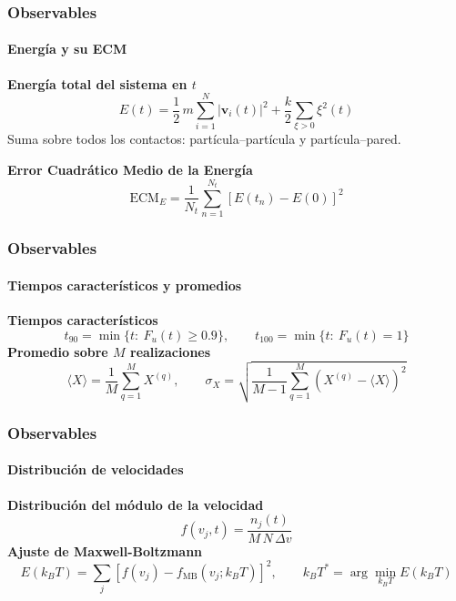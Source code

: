 \documentclass[11pt,aspectratio=169]{beamer}
\newcommand{\vect}[1]{\mathbf{#1}}          %
\newcommand{\kT}{k_BT}
\newcommand{\ecmE}{\mathrm{ECM}_E}           %
\begin{document}
\begin{frame}
  \frametitle{Observables}
  \framesubtitle{Energía y su ECM}

  \vfill
  \begin{center}
    \textbf{Energía total del sistema en $t$}
    \[
      E(t)=\frac{1}{2}\,m\sum_{i=1}^{N}\left|\vect{v}_i(t)\right|^2
      +\frac{k}{2}\sum_{\xi>0}\xi^2(t)
    \]
    {\footnotesize Suma sobre todos los contactos: partícula--partícula y partícula--pared.}\par
    \vspace{1.5em}
    \textbf{Error Cuadrático Medio de la Energía}
    \[
      \ecmE=\frac{1}{N_t}\sum_{n=1}^{N_t}\left[E(t_n)-E(0)\right]^2
    \]
  \end{center}
  \vfill
\end{frame}

\begin{frame}
  \frametitle{Observables}
  \framesubtitle{Tiempos característicos y promedios}

  \vfill
  \begin{center}
    \textbf{Tiempos característicos}
    \[
      t_{90}=\min\{t:\ F_u(t)\ge 0.9\},
      \qquad
      t_{100}=\min\{t:\ F_u(t)=1\}
    \]
    \textbf{Promedio sobre $M$ realizaciones}
    \[
      \langle X\rangle=\frac{1}{M}\sum_{q=1}^{M}X^{(q)},
      \qquad
      \sigma_X=\sqrt{\frac{1}{M-1}\sum_{q=1}^{M}\left(X^{(q)}-\langle X\rangle\right)^2}
    \]
  \end{center}
  \vfill
\end{frame}

\begin{frame}
  \frametitle{Observables}
  \framesubtitle{Distribución de velocidades}

  \vfill
  \begin{center}
    \textbf{Distribución del módulo de la velocidad}
    \[
      f(v_j,t)=\frac{n_j(t)}{M\,N\,\Delta v}
    \]
    \vspace{0.8em}
    \textbf{Ajuste de Maxwell-Boltzmann}
    \[
      E(\kT)=\sum_j\left[f(v_j)-f_{\mathrm{MB}}(v_j;\kT)\right]^2,
      \qquad
      \kT^{*}=\arg\min_{\kT}E(\kT)
    \]
  \end{center}
  \vfill
\end{frame}
\end{document}

